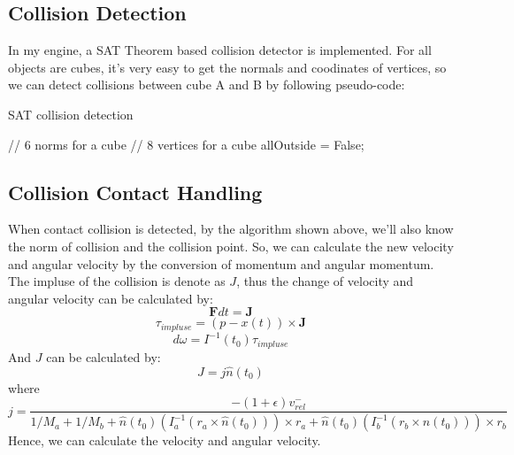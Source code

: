 \documentclass[acmtog]{acmart}
\begin{document}
\subsection{Collision Detection}
In my engine, a SAT Theorem based collision detector is implemented. For all objects are cubes, 
it's very easy to get the normals and coodinates of vertices, so we can detect collisions between
cube A and B by following pseudo-code:
\begin{algorithm}
	\caption {SAT collision detection}	
	\begin{algorithmic}[1]
		 // 6 norms for a cube
			 // 8 vertices for a cube
					\State allOutside = False;
				\EndIf
			\EndFor
			\EndIf
		\EndFor	
	\end{algorithmic}
\end{algorithm}

\subsection{Collision Contact Handling}
When contact collision is detected, by the algorithm shown above, we'll also know the norm of collision 
and the collision point. So, we can calculate the new velocity and angular velocity by the conversion of 
momentum and angular momentum. The impluse of the collision is denote as $J$, thus the change of velocity 
and angular velocity can be calculated by:
$$\textbf{F}dt = \textbf{J}$$
$$\tau_{impluse} = (p - x(t)) \times \textbf{J}$$
$$d\omega = I^{-1}(t_0)\tau_{impluse}$$
And $J$ can be calculated by:
$$J = j \hat{n}(t_0)$$
where
$$j = \frac{-(1+\epsilon)v_{rel}^{-}}{1/M_a + 1/M_b + \hat{n}(t_0)(I_a^{-1} (r_a\times\hat{n}(t_0))) \times r_a + \hat{n}(t_0)(I_b^{-1} (r_b\times\hat{n}(t_0))) \times r_b}$$
Hence, we can calculate the velocity and angular velocity.

\end{document}
